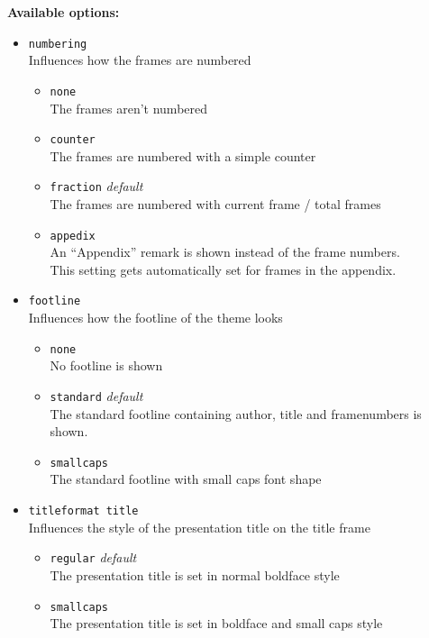 \documentclass[12pt,a4paper]{scrartcl}
\begin{document}
	\textbf{Available options:}
	\begin{itemize}
		\item \texttt{numbering} \\
				Influences how the frames are numbered
				\begin{itemize}
					\item \texttt{none} \\
					The frames aren't numbered
					\item \texttt{counter} \\
					The frames are numbered with a simple counter
					\item \texttt{fraction}			\hfill \textit{default} \\
					The frames are numbered with current frame / total frames
					\item \texttt{appedix} \\
					An \enquote{Appendix} remark is shown instead of the frame numbers. \\
					This setting gets automatically set for frames in the appendix.
				\end{itemize}
		\item \texttt{footline} \\
				Influences how the footline of the theme looks
				\begin{itemize}
					\item \texttt{none} \\
					No footline is shown
					\item \texttt{standard}			\hfill \textit{default} \\
					The standard footline containing author, title and framenumbers is shown.
					\item \texttt{smallcaps} \\
					The standard footline with small caps font shape
				\end{itemize}
		\item \texttt{titleformat title} \\
				Influences the style of the presentation title on the title frame
				\begin{itemize}
					\item \texttt{regular}			\hfill \textit{default}\\
					The presentation title is set in normal boldface style
					\item \texttt{smallcaps} \\
					The presentation title is set in boldface and small caps style
				\end{itemize}
	\end{itemize}
\end{document}
